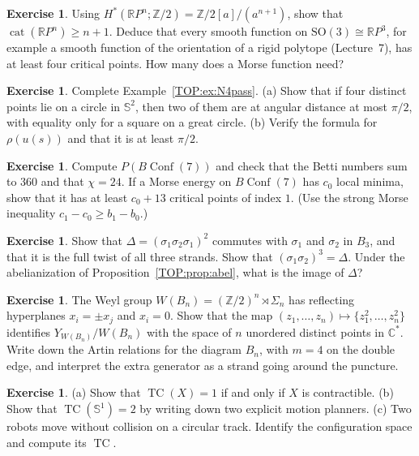 \documentclass[11pt,openany]{book}
\theoremstyle{plain}
\theoremstyle{definition}
\newtheorem{exercise}[theorem]{Exercise}
\theoremstyle{remark}
\newcommand{\R}{\mathbb{R}}
\newcommand{\Z}{\mathbb{Z}}
\newcommand{\C}{\mathbb{C}}
\newcommand{\Sph}{\mathbb{S}}          %
\newcommand{\SO}{\mathrm{SO}}
\newcommand{\Conf}{\operatorname{Conf}}
\begin{document}
\begin{exercise}
Using $H^*(\R P^n;\Z/2)=\Z/2[a]/(a^{n+1})$, show that $\operatorname{cat}(\R P^n)\ge n+1$. Deduce that every
smooth function on $\SO(3)\cong\R P^3$, for example a smooth function of the orientation of a rigid
polytope (Lecture~7), has at least four critical points. How many does a Morse function need?
\end{exercise}

\begin{exercise}\label{TOP:exc:N4}
Complete Example~\ref{TOP:ex:N4pass}. (a) Show that if four distinct points lie on a circle in $\Sph^2$, then
two of them are at angular distance at most $\pi/2$, with equality only for a square on a great circle.
(b) Verify the formula for $\rho(u(s))$ and that it is at least $\pi/2$.
\end{exercise}

\begin{exercise}
Compute $P(B\Conf(7))$ and check that the Betti numbers sum to $360$ and that $\chi=24$. If a Morse energy on
$B\Conf(7)$ has $c_0$ local minima, show that it has at least $c_0+13$ critical points of index $1$. (Use the
strong Morse inequality $c_1-c_0\ge b_1-b_0$.)
\end{exercise}

\begin{exercise}
Show that $\Delta=(\sigma_1\sigma_2\sigma_1)^2$ commutes with $\sigma_1$ and $\sigma_2$ in $B_3$, and that it
is the full twist of all three strands. Show that $(\sigma_1\sigma_2)^3=\Delta$. Under the abelianization of
Proposition~\ref{TOP:prop:abel}, what is the image of $\Delta$?
\end{exercise}

\begin{exercise}\label{TOP:exc:Bn}
The Weyl group $W(B_n)=(\Z/2)^n\rtimes\Sigma_n$ has reflecting hyperplanes $x_i=\pm x_j$ and $x_i=0$. Show
that the map $(z_1,\dots,z_n)\mapsto\{z_1^2,\dots,z_n^2\}$ identifies $Y_{W(B_n)}/W(B_n)$ with the space of
$n$ unordered distinct points in $\C^*$. Write down the Artin relations for the diagram $B_n$, with
$m=4$ on the double edge, and interpret the extra generator as a strand going around the puncture.
\end{exercise}

\begin{exercise}\label{TOP:exc:TC}
(a) Show that $\operatorname{TC}(X)=1$ if and only if $X$ is contractible. (b) Show that
$\operatorname{TC}(\Sph^1)=2$ by writing down two explicit motion planners. (c) Two robots move
without collision on a circular track. Identify the configuration space and compute its $\operatorname{TC}$.
\end{exercise}
\end{document}
